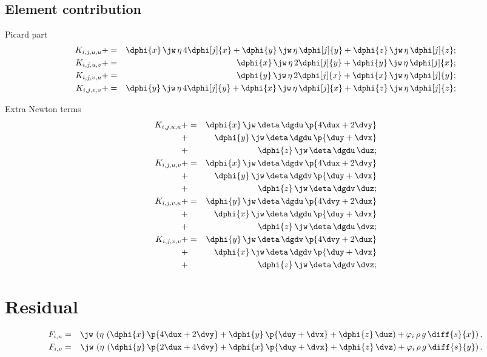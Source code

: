 \documentclass{article}
\begin{document}
\subsection{Element contribution}
\label{sec:element-matrix}


Picard part
\begin{eqnarray*}
 K_{i,j,u,u} &+=& \dphi{x}\,\jw\,\eta\,4\dphi[j]{x} + \dphi{y}\,\jw\,\eta\,\dphi[j]{y} + \dphi{z}\,\jw\,\eta\,\dphi[j]{z};\\
  K_{i,j,u,v} &+=& \dphi{x}\,\jw\,\eta\,2\dphi[j]{y} + \dphi{y}\,\jw\,\eta\,\dphi[j]{x};\\
  K_{i,j,v,u} &+=& \dphi{y}\,\jw\,\eta\,2\dphi[j]{x} + \dphi{x}\,\jw\,\eta\,\dphi[j]{y};\\
  K_{i,j,v,v} &+=& \dphi{y}\,\jw\,\eta\,4\dphi[j]{y} + \dphi{x}\,\jw\,\eta\,\dphi[j]{x} + \dphi{z}\,\jw\,\eta\,\dphi[j]{z};\\
\end{eqnarray*}

Extra Newton terms
\begin{eqnarray*}
  K_{i,j,u,u} &+=& \dphi{x}\,\jw\,\deta\,\dgdu\,\p{4\dux+2\dvy}\\
  &+& \dphi{y}\,\jw\,\deta\,\dgdu\,\p{\duy+\dvx}\\
  &+& \dphi{z}\,\jw\,\deta\,\dgdu\,\duz;\\
  K_{i,j,u,v} &+=& \dphi{x}\,\jw\,\deta\,\dgdv\,\p{4\dux+2\dvy}\\
  &+& \dphi{y}\,\jw\,\deta\,\dgdv\,\p{\duy+\dvx}\\
  &+& \dphi{z}\,\jw\,\deta\,\dgdv\,\duz;\\
  K_{i,j,v,u} &+=& \dphi{y}\,\jw\,\deta\,\dgdu\,\p{4\dvy+2\dux}\\
  &+& \dphi{x}\,\jw\,\deta\,\dgdu\,\p{\duy+\dvx}\\
  &+& \dphi{z}\,\jw\,\deta\,\dgdu\,\dvz;\\
  K_{i,j,v,v} &+=& \dphi{y}\,\jw\,\deta\,\dgdv\,\p{4\dvy+2\dux}\\
  &+& \dphi{x}\,\jw\,\deta\,\dgdv\,\p{\duy+\dvx}\\
  &+& \dphi{z}\,\jw\,\deta\,\dgdv\,\dvz;\\
\end{eqnarray*}

\section{Residual}
\label{sec:residual}

\begin{eqnarray}
  \label{eq:4}
  F_{i,u} &=& \jw\, \left(\eta\, \left(\dphi{x}\, \p{4\dux + 2\dvy} + \dphi{y}\,
      \p{\duy + \dvx} + \dphi{z}\, \duz \right) + \varphi_{i}\, \rho\, g\, \diff{s}{x}\right),\\
  F_{i,v} &=& \jw\, \left(\eta\, \left(\dphi{y}\, \p{2\dux + 4\dvy} + \dphi{x}\, \p{\duy + \dvx} +
      \dphi{z}\, \dvz \right) + \varphi_{i}\, \rho\, g\, \diff{s}{y}\right).
\end{eqnarray}
\end{document}
